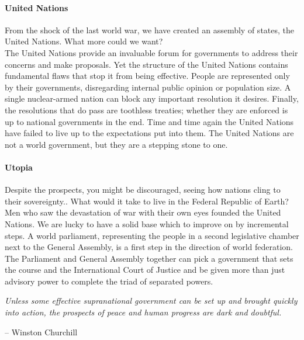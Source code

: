 \documentclass[11pt,a4paper]{article}
\begin{document}
\begin{multicols}{2}
\paragraph{United Nations}

From the shock of the last world war, we have created an assembly of states, the United Nations. What more could we want?\\
\noindent The United Nations provide an invaluable forum for governments to address their concerns and make proposals.
Yet the structure of the United Nations contains fundamental flaws that stop it from being effective.
People are represented only by their governments, disregarding internal public opinion or population size.
A single nuclear-armed nation can block any important resolution it desires.
Finally, the resolutions that do pass are toothless treaties; whether they are enforced is up to national governments in the end.
Time and time again the United Nations have failed to live up to the expectations put into them.
The United Nations are not a world government, but they are a stepping stone to one.


\paragraph{Utopia}

Despite the prospects, you might be discouraged, seeing how nations cling to their sovereignty.. What would it take to live in the Federal Republic of Earth?\\
\noindent Men who saw the devastation of war with their own eyes founded the United Nations. We are lucky to have a solid base which to improve on by incremental steps.
A world parliament, representing the people in a second legislative chamber next to the General Assembly, is a first step in the direction of world federation.
The Parliament and General Assembly together can pick a government that sets the course and the International Court of Justice and be given more than just advisory power to complete the triad of separated powers.

\begin{shaded*}
\noindent \textit{Unless some effective supranational government can be set up and brought quickly into action, the prospects of peace and human progress are dark and doubtful.}
\begin{flushright}
-- Winston Churchill
\end{flushright}
\vspace{-12pt}
\end{shaded*}

\end{multicols}
\end{document}
